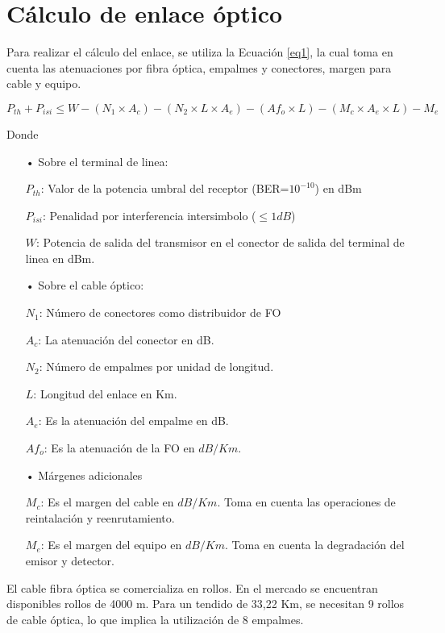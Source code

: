 \section{Cálculo de enlace óptico}
Para realizar el cálculo del enlace, se utiliza la Ecuación \ref{eq1}, la cual toma en cuenta las atenuaciones por fibra óptica, empalmes y conectores, margen para cable y equipo.

\begin{equation}\label{eq1}
P_{th}+P_{isi}\leq W-(N_1\times A_c)-(N_2\times L\times A_e)-(Af_o\times L)-(M_c\times A_e\times L)-M_e
\end{equation}

Donde

\begin{enumerate}

\item[•] Sobre el terminal de linea:

$P_{th}$: Valor de la potencia umbral del receptor (BER=$10^{-10}$) en dBm

$P_{isi}$: Penalidad por interferencia intersimbolo ($\leq 1dB$)

$W$: Potencia de salida del transmisor en el conector de salida del terminal de linea en dBm.

\item[•] Sobre el cable óptico:

$N_1$: Número de conectores como distribuidor de FO

$A_c$: La atenuación del conector en dB.

$N_2$: Número de empalmes por unidad de longitud.

$L$: Longitud del enlace en Km.

$A_e$: Es la atenuación del empalme en dB.

$Af_o$: Es la atenuación de la FO en $dB/Km$.


\item[•] Márgenes adicionales

$M_c$: Es el margen del cable en $dB/Km$. Toma en cuenta las operaciones de reintalación y reenrutamiento.

$M_e$: Es el margen del equipo en $dB/Km$. Toma en cuenta la degradación del emisor y detector.  



\end{enumerate}

El cable fibra óptica se comercializa en rollos. En el mercado se encuentran disponibles rollos de 4000 m. Para un tendido de 33,22 Km, se necesitan 9 rollos de cable óptica, lo que implica la utilización de 8 empalmes. 


